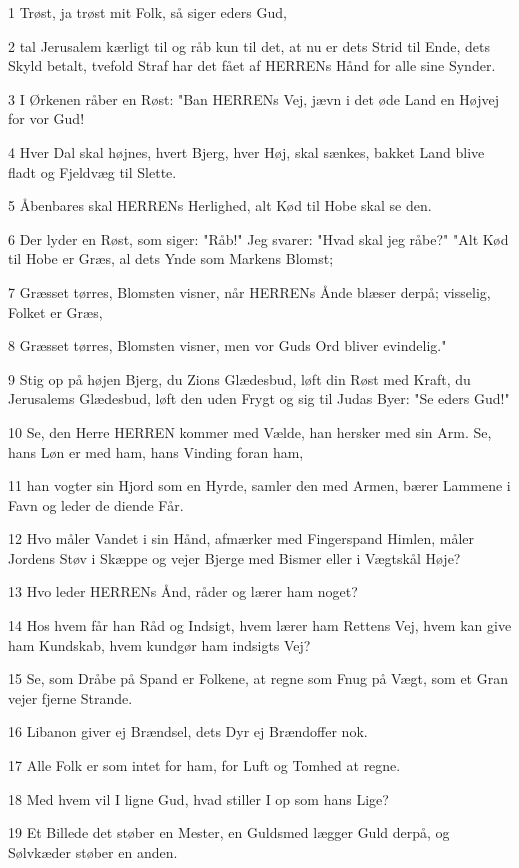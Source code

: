 \par 1 Trøst, ja trøst mit Folk, så siger eders Gud,
\par 2 tal Jerusalem kærligt til og råb kun til det, at nu er dets Strid til Ende, dets Skyld betalt, tvefold Straf har det fået af HERRENs Hånd for alle sine Synder.
\par 3 I Ørkenen råber en Røst: "Ban HERRENs Vej, jævn i det øde Land en Højvej for vor Gud!
\par 4 Hver Dal skal højnes, hvert Bjerg, hver Høj, skal sænkes, bakket Land blive fladt og Fjeldvæg til Slette.
\par 5 Åbenbares skal HERRENs Herlighed, alt Kød til Hobe skal se den.
\par 6 Der lyder en Røst, som siger: "Råb!" Jeg svarer: "Hvad skal jeg råbe?" "Alt Kød til Hobe er Græs, al dets Ynde som Markens Blomst;
\par 7 Græsset tørres, Blomsten visner, når HERRENs Ånde blæser derpå; visselig, Folket er Græs,
\par 8 Græsset tørres, Blomsten visner, men vor Guds Ord bliver evindelig."
\par 9 Stig op på højen Bjerg, du Zions Glædesbud, løft din Røst med Kraft, du Jerusalems Glædesbud, løft den uden Frygt og sig til Judas Byer: "Se eders Gud!"
\par 10 Se, den Herre HERREN kommer med Vælde, han hersker med sin Arm. Se, hans Løn er med ham, hans Vinding foran ham,
\par 11 han vogter sin Hjord som en Hyrde, samler den med Armen, bærer Lammene i Favn og leder de diende Får.
\par 12 Hvo måler Vandet i sin Hånd, afmærker med Fingerspand Himlen, måler Jordens Støv i Skæppe og vejer Bjerge med Bismer eller i Vægtskål Høje?
\par 13 Hvo leder HERRENs Ånd, råder og lærer ham noget?
\par 14 Hos hvem får han Råd og Indsigt, hvem lærer ham Rettens Vej, hvem kan give ham Kundskab, hvem kundgør ham indsigts Vej?
\par 15 Se, som Dråbe på Spand er Folkene, at regne som Fnug på Vægt, som et Gran vejer fjerne Strande.
\par 16 Libanon giver ej Brændsel, dets Dyr ej Brændoffer nok.
\par 17 Alle Folk er som intet for ham, for Luft og Tomhed at regne.
\par 18 Med hvem vil I ligne Gud, hvad stiller I op som hans Lige?
\par 19 Et Billede det støber en Mester, en Guldsmed lægger Guld derpå, og Sølvkæder støber en anden.
